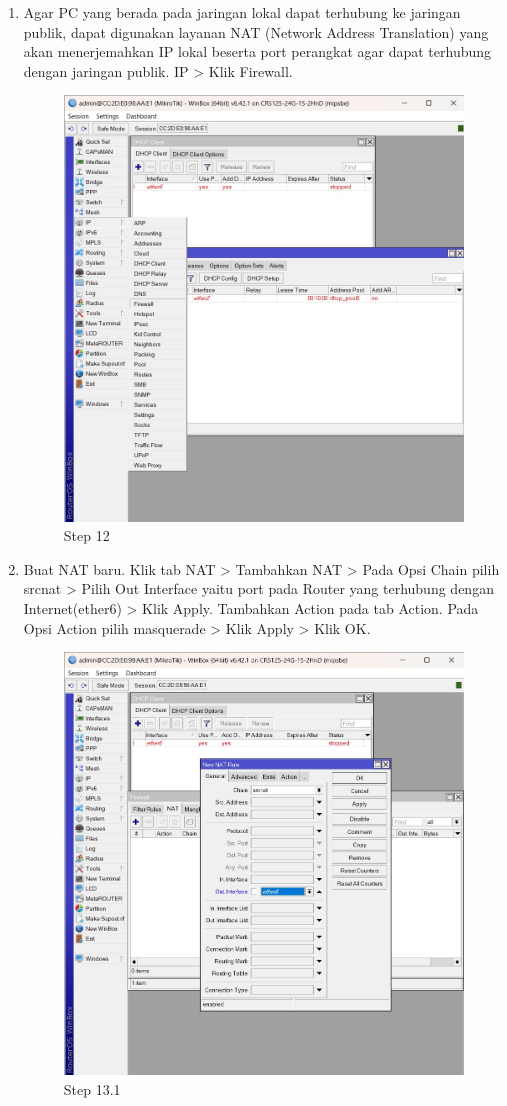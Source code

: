 \begin{enumerate}
	\item Agar PC yang berada pada jaringan lokal dapat terhubung ke jaringan publik, dapat digunakan
	layanan NAT (Network Address Translation) yang akan menerjemahkan IP lokal beserta port
	perangkat agar dapat terhubung dengan jaringan publik. IP > Klik Firewall.	
	\begin{figure}[H]
		\centering
		\includegraphics[width=0.5\linewidth]{P3/img/step12.jpg}
		\caption{Step 12}
		\label{fig:gambar4}
	\end{figure}

	\item Buat NAT baru. Klik tab NAT > Tambahkan NAT > Pada Opsi Chain pilih srcnat > Pilih Out Interface yaitu port pada Router yang terhubung dengan Internet(ether6) > Klik Apply. Tambahkan
	Action pada tab Action. Pada Opsi Action pilih masquerade > Klik Apply > Klik OK.
	\begin{figure}[H]
		\centering
		\includegraphics[width=0.5\linewidth]{P3/img/step13.1.jpg}
		\caption{Step 13.1}
		\label{fig:gambar4}


\end{figure}
\end{enumerate}

